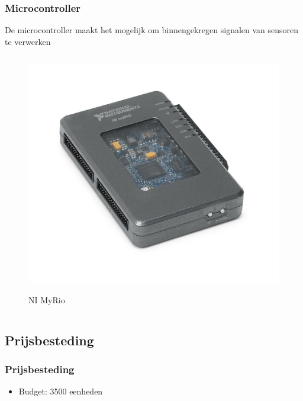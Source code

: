 \documentclass
   [kulak] %
   {kulakbeamer}
\begin{document}
\begin{frame}
\end{frame}



\begin{frame}
	\frametitle{Microcontroller}
	De microcontroller maakt het mogelijk om binnengekregen signalen van sensoren te verwerken
	\begin{columns}
		\begin{figure}
			\centering
			\includegraphics[width=.7\textwidth]{NI-myrio}
			\caption{NI MyRio}\cite{nimyrio}
		\end{figure}
	\end{columns}
	
\end{frame}


\subsection{Prijsbesteding}
\begin{frame}
	\frametitle{Prijsbesteding}
	\begin{itemize}
		\item Budget: 3500 eenheden
	\end{itemize}
\end{frame}
\end{document}
